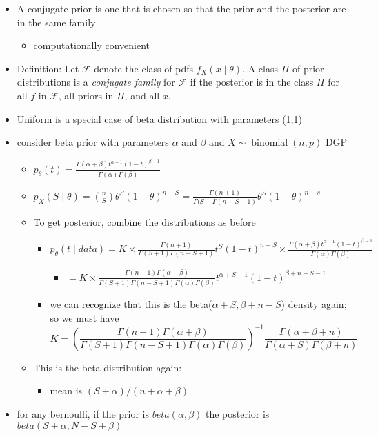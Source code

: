 \begin{itemize}
\item A conjugate prior is one that is chosen so that the prior and
       the posterior are in the same family
\begin{itemize}
\item computationally convenient
\end{itemize}
\item Definition: \citep[From][7.2.3]{CaB_2001} Let $\mathcal{F}$ denote the class of pdfs $f_X(x \mid \theta)$.  A class $\Pi$
       of prior distributions is a \emph{conjugate family} for $\mathcal F$ if the posterior is in the class $\Pi$ for all $f$ in $\mathcal F$,
       all priors in $\Pi$, and all $x$.
\item Uniform is a special case of beta distribution with
       parameters (1,1)
\item consider beta prior with parameters $\alpha$ and $\beta$ and
       $X \sim \operatorname{binomial}(n,p)$ DGP
\begin{itemize}
\item $p_\theta(t) = \frac{\Gamma(\alpha + \beta) t^{\alpha-1}
         (1-t)^{\beta-1}}{\Gamma(\alpha) \Gamma(\beta)}$
     \item $p_{X}(S \mid \theta) = \binom{n}{S} \theta^S
       (1-\theta)^{n-S} = \frac{\Gamma(n + 1)}{\Gamma(S + \Gamma(n - S
         + 1)} \theta^S (1-\theta)^{n-s}$
\item To get posterior, combine the distributions as before
\begin{itemize}
\item $p_\theta(t \mid data) 
           = K \times \frac{\Gamma(n + 1)}{\Gamma(S + 1) \Gamma(n - S + 1)} t^S (1-t)^{n-S} \times \frac{\Gamma(\alpha + \beta) t^{\alpha-1} (1-t)^{\beta-1}}{\Gamma(\alpha) \Gamma(\beta)}$
\begin{itemize}
\item $= K \times \frac{\Gamma(n + 1) \Gamma(\alpha + \beta)}{\Gamma(S + 1) \Gamma(n - S + 1) \Gamma(\alpha) \Gamma(\beta)} t^{\alpha + S - 1} (1 - t)^{\beta + n - S - 1}$
\end{itemize}
\item we can recognize that this is the beta($\alpha + S, \beta + n - S$) density again; so we must have 
           \[ K = (\frac{\Gamma(n + 1) \Gamma(\alpha + \beta)}{\Gamma(S + 1) \Gamma(n - S + 1)\Gamma(\alpha)\Gamma(\beta)})^{-1} \frac{\Gamma(\alpha + \beta + n)}{\Gamma(\alpha + S)\Gamma(\beta + n)} \]
\end{itemize}
\item This is the beta distribution again:
\begin{itemize}
\item mean is $(S + \alpha) / (n + \alpha + \beta)$
\end{itemize}
\end{itemize}
\item for any bernoulli, if the prior is $beta(\alpha,\beta)$ the
       posterior is $beta(S + \alpha, N - S + \beta)$
\end{itemize}

